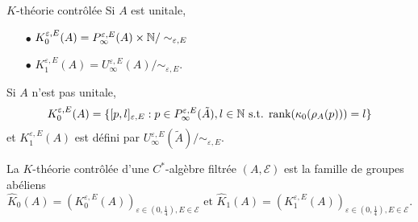 \begin{frame}{$K$-théorie contrôlée}
Si $A$ est unitale,
\begin{itemize}
\item[$\bullet$] $K_0^{\varepsilon,E}(A) = P^{\varepsilon, E}_\infty(A)\times \mathbb N / \sim_{\varepsilon,E}$ 
\item[$\bullet$] $K_1^{\varepsilon,E}(A) = U^{\varepsilon, E}_\infty(A) / \sim_{\varepsilon,E}$.
\end{itemize}

Si $A$ n'est pas unitale,  
\[K_0^{\varepsilon,E}(A) = \{[p,l]_{\varepsilon,E} : p\in P^{\varepsilon,E}_\infty (\tilde A), l\in \mathbb N \text{ s.t. rank}(\kappa_0(\rho_A(p)))=l \}\]
et $K_1^{\varepsilon,E}(A)$ est défini par $U_\infty^{\varepsilon,E}(\tilde A)/ \sim_{\varepsilon,E}$.\\

\begin{definitionfr}
La $K$-théorie contrôlée d'une $C^*$-algèbre filtrée $(A,\mathcal E)$ est la famille de groupes abéliens 
\[\hat K_0(A) = (K_0^{\varepsilon,E}(A))_{\varepsilon\in (0,\frac{1}{4}),E\in\mathcal E} \text{ et } \hat K_1(A) = (K_1^{\varepsilon,E}(A))_{\varepsilon\in (0,\frac{1}{4}),E\in\mathcal E}.\]
\end{definitionfr}
\end{frame}

